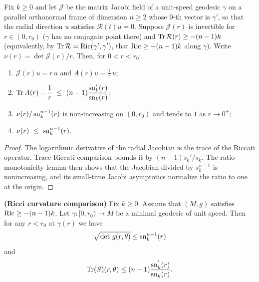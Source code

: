 \begin{lemma}
\label{lem:frame-volume-comparison}





Fix $k\ge0$ and let $\mathcal J$ be the matrix Jacobi field of a unit-speed
geodesic $\gamma$ on a parallel orthonormal frame of dimension $n\ge2$ whose
$0$-th vector is $\gamma'$, so that the radial direction $u$ satisfies
$\mathcal R(t)u=0$. Suppose $\mathcal J(r)$ is invertible for $r\in(0,r_0)$
($\gamma$ has no conjugate point there) and $\operatorname{Tr}\mathcal R(r)\ge-(n-1)k$
(equivalently, by $\operatorname{Tr}\mathcal R=\operatorname{Ric}(\gamma',\gamma')$, that
$\operatorname{Ric}\ge-(n-1)k$ along $\gamma$). Write $\nu(r)=\det\mathcal J(r)/r$. Then,
for $0<r<r_0$:
\begin{enumerate}
\item $\mathcal J(r)u=r\,u$ and $A(r)u=\tfrac1r\,u$;
\item $\Tr A(r)-\dfrac1r\ \le\ (n-1)\dfrac{\sn_k'(r)}{\sn_k(r)}$;
\item $\nu(r)/\operatorname{sn}_k^{n-1}(r)$ is non-increasing on $(0,r_0)$ and tends to $1$
as $r\to0^+$;
\item $\nu(r)\ \le\ \sn_k^{n-1}(r)$.
\end{enumerate}
\end{lemma}

\begin{proof}
\sketch
{}

The logarithmic derivative of the radial Jacobian is the trace of the Riccati operator. Trace Riccati comparison bounds it by $(n-1)s_k'/s_k$. The ratio-monotonicity lemma then shows that the Jacobian divided by $s_k^{n-1}$ is nonincreasing, and its small-time Jacobi asymptotics normalize the ratio to one at the origin.
\end{proof}

\begin{theorem}
\label{thm:ricci-curvature-comparison}

\label{riccurvcomp}



{\bf (Ricci curvature comparison)} Fix $k\ge 0$. Assume that $(M,
g)$ satisfies $\operatorname{Ric} \geq -(n-1)k$. Let $\gamma\colon [0,r_0)\to
M$ be a minimal geodesic of unit speed. Then for any $r<r_0$ at
$\gamma(r)$ we have
$$\sqrt{\det\, g(r,\theta)} \leq \operatorname{sn}^{n-1}_{k}(r)$$ and
$$\operatorname{Tr}(S)(r,\theta) \leq (n-1)\frac{\operatorname{sn}_{k}^{'}(r)}{\operatorname{sn}_{k}(r)}.$$
\end{theorem}

